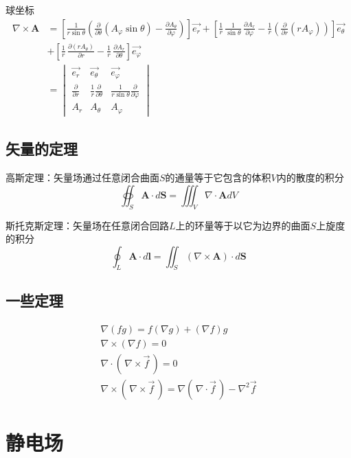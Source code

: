 \documentclass[12pt, UTF8, AutoFakeBold]{ctexart} %
\begin{document}
球坐标
\begin{align*}
    \nabla \times \boldsymbol{A} &=
    \left[\frac{1}{r\sin\theta}\left(\frac{\partial}{\partial\theta}(A_\varphi \sin\theta) - \frac{\partial A_\theta}{\partial\varphi}\right)\right]\vec{e_r}
    + \left[\frac{1}{r} \, \frac{1}{\sin\theta} \, \frac{\partial A_r}{\partial \varphi} - \frac{1}{r}\left(\frac{\partial}{\partial r}(r A_\varphi)\right)\right]\vec{e_\theta}\\
    &+ \left[\frac{1}{r} \, \frac{\partial (r A_\theta)}{\partial r} - \frac{1}{r} \, \frac{\partial A_r}{\partial\theta}\right]\vec{e_\varphi}\\
    &=
    \begin{vmatrix}
        \vec{e_r} & \vec{e_\theta} & \vec{e_\varphi}\\
        \frac{\partial}{\partial r} & \frac{1}{r} \frac{\partial}{\partial\theta} & \frac{1}{r \sin\theta}\frac{\partial}{\partial\varphi}\\
        A_r & A_\theta & A_\varphi
    \end{vmatrix}
\end{align*}

\subsection{矢量的定理}
高斯定理：矢量场通过任意闭合曲面$S$的通量等于它包含的体积$V$内的散度的积分
\[
    \oiint_S\boldsymbol{A} \cdot d\boldsymbol{S} = \iiint_V \nabla \cdot \boldsymbol{A}dV
\]

斯托克斯定理：矢量场在任意闭合回路$L$上的环量等于以它为边界的曲面$S$上旋度的积分
\[
    \oint_L\boldsymbol{A} \cdot d\boldsymbol{l} = \iint_S (\nabla \times \boldsymbol{A}) \cdot d\boldsymbol{S}
\]

\subsection{一些定理}
\vspace{-2.5em}
\begin{gather*}
    \nabla(fg) = f(\nabla g) + (\nabla f)g\\
    \nabla \times (\nabla f) = 0\\
    \nabla \cdot (\,\nabla \times \vec{f}\,) = 0\\
    \nabla \times (\,\nabla \times \vec{f}\,) = \nabla (\,\nabla \cdot \vec{f}\,) - \nabla^2 \vec{f}
\end{gather*}

\section{静电场}
\end{document}
